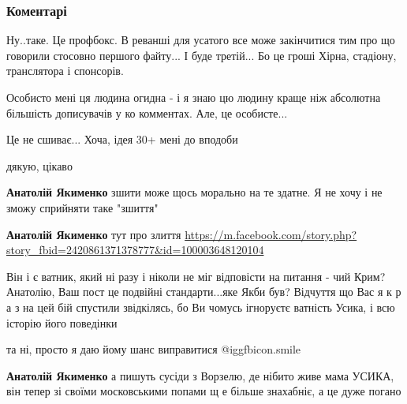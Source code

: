  
 
 
 
 
\subsubsection{Коментарі}

\begin{itemize} %

Ну..таке. Це профбокс. В реванші для усатого все може закінчитися тим про що
говорили стосовно першого файту... І буде третій... Бо це гроші Хірна,
стадіону, транслятора і спонсорів.

Особисто мені ця людина огидна - і я знаю цю людину краще ніж абсолютна
більшість дописувачів у ко комментах. Але, це особисте...

Це не сшиває... Хоча, ідея 30+ мені до вподоби

\begin{itemize} %
дякую, цікаво

\textbf{Анатолій Якименко} зшити може щось морально на те здатне. Я не хочу і не зможу сприйняти таке "зшиття"

\textbf{Анатолій Якименко} тут про злиття
\url{https://m.facebook.com/story.php?story_fbid=2420861371378777&id=100003648120104}
\end{itemize} %


Він і є ватник, який ні разу і ніколи не міг відповісти на питання - чий Крим?
Анатолію, Ваш пост це подвійні стандарти...яке Якби був? Відчуття що Вас я к р
а з на цей бій спустили звідкілясь, бо Ви чомусь ігноруєтє ватність Усика, і
всю історію його поведінки

\begin{itemize} %
та ні, просто я даю йому шанс виправитися  @igg{fbicon.smile} 

\textbf{Анатолій Якименко} а пишуть сусіди з Ворзелю, де нібито живе мама
УСИКА, він тепер зі своїми московськими попами щ е більше знахабніє, а це дуже погано


\end{itemize}
\end{itemize}
